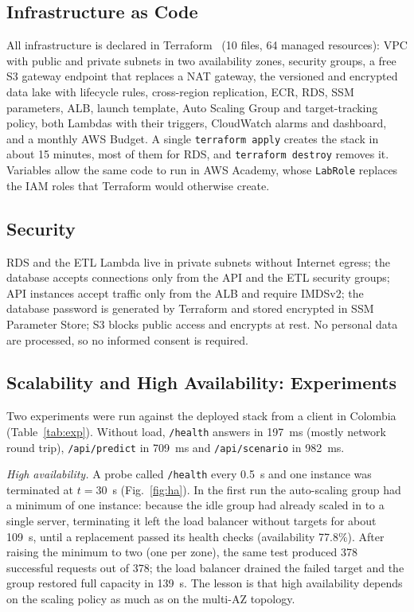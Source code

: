 \documentclass[conference]{IEEEtran}
\begin{document}
\subsection{Infrastructure as Code}
All infrastructure is declared in Terraform~\cite{terraform_aws} (10 files, 64 managed resources): VPC with public and private subnets in two availability zones, security groups, a free S3 gateway endpoint that replaces a NAT gateway, the versioned and encrypted data lake with lifecycle rules, cross-region replication, ECR, RDS, SSM parameters, ALB, launch template, Auto Scaling Group and target-tracking policy, both Lambdas with their triggers, CloudWatch alarms and dashboard, and a monthly AWS Budget. A single \texttt{terraform apply} creates the stack in about 15 minutes, most of them for RDS, and \texttt{terraform destroy} removes it. Variables allow the same code to run in AWS Academy, whose \texttt{LabRole} replaces the IAM roles that Terraform would otherwise create.

\subsection{Security}
RDS and the ETL Lambda live in private subnets without Internet egress; the database accepts connections only from the API and the ETL security groups; API instances accept traffic only from the ALB and require IMDSv2; the database password is generated by Terraform and stored encrypted in SSM Parameter Store; S3 blocks public access and encrypts at rest. No personal data are processed, so no informed consent is required.

\subsection{Scalability and High Availability: Experiments}
Two experiments were run against the deployed stack from a client in Colombia (Table~\ref{tab:exp}). Without load, \texttt{/health} answers in 197~ms (mostly network round trip), \texttt{/api/predict} in 709~ms and \texttt{/api/scenario} in 982~ms.

\emph{High availability.} A probe called \texttt{/health} every 0.5~s and one instance was terminated at $t=30$~s (Fig.~\ref{fig:ha}). In the first run the auto-scaling group had a minimum of one instance: because the idle group had already scaled in to a single server, terminating it left the load balancer without targets for about 109~s, until a replacement passed its health checks (availability 77.8\%). After raising the minimum to two (one per zone), the same test produced 378 successful requests out of 378; the load balancer drained the failed target and the group restored full capacity in 139~s. The lesson is that high availability depends on the scaling policy as much as on the multi-AZ topology.
\end{document}
